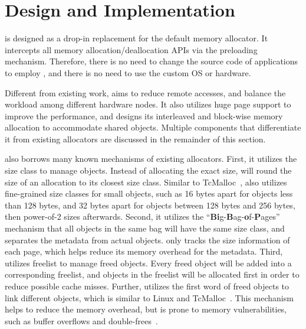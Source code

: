 \section{Design and Implementation}
\label{sec:implement}

\NM{} is designed as a drop-in replacement for the default memory allocator. It intercepts all memory allocation/deallocation APIs via the preloading mechanism. Therefore, there is no need to change the source code of applications to employ \NM{}, and there is no need to use the custom OS or hardware. 

Different from existing work, \NA{} aims to reduce remote accesses, and balance the workload among different hardware nodes. It also utilizes huge page support to improve the performance, and designs its interleaved and block-wise memory allocation to accommodate shared objects. Multiple components that differentiate it from existing allocators are discussed in the remainder of this section. 
  
\NA{} also borrows many known mechanisms of existing allocators. First, it utilizes the size class to manage objects. Instead of allocating the exact size, \NA{} will round the size of an allocation to its closest size class. Similar to TcMalloc~\cite{tcmalloc}, \NA{} also utilizes fine-grained size classes for small objects, such as 16 bytes apart for objects less than 128 bytes, and 32 bytes apart for objects between 128 bytes and 256 bytes, then power-of-2 sizes afterwards. Second, it utilizes the ``\textbf{Bi}g-\textbf{B}ag-\textbf{o}f-\textbf{P}ages'' mechanism that all objects in the same bag will have the same size class, and separates the metadata from actual objects. \NA{} only tracks the size information of each page, which helps reduce its memory overhead for the metadata. Third, \NA{} utilizes freelist to manage freed objects. Every freed object will be added into a corresponding freelist, and objects in the freelist will be allocated first in order to reduce possible cache misses. Further, \NA{} utilizes the first word of freed objects to link different objects, which is similar to Linux and TcMalloc~\cite{tcmalloc}. This mechanism helps to reduce the memory overhead, but is prone to memory vulnerabilities, such as buffer overflows and double-frees~\cite{DieHarder, Guarder}.     

